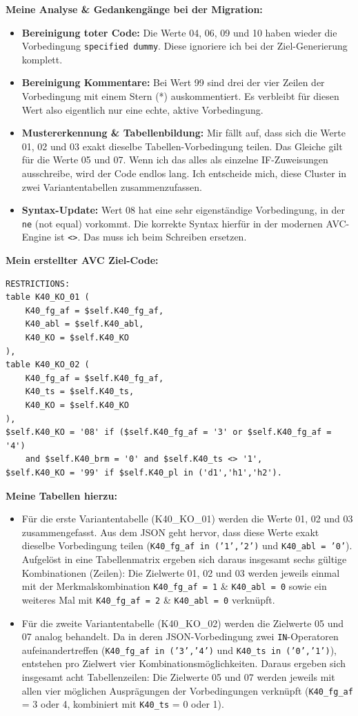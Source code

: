 \documentclass[12pt, a4paper, oneside]{book}
\begin{document}
\textbf{Meine Analyse \& Gedankengänge bei der Migration:}
\begin{itemize}
    \item \textbf{Bereinigung toter Code:} Die Werte 04, 06, 09 und 10 haben wieder die Vorbedingung \texttt{specified dummy}. Diese ignoriere ich bei der Ziel-Generierung komplett.
    \item \textbf{Bereinigung Kommentare:} Bei Wert 99 sind drei der vier Zeilen der Vorbedingung mit einem Stern (*) auskommentiert. Es verbleibt für diesen Wert also eigentlich nur eine echte, aktive Vorbedingung.
    \item \textbf{Mustererkennung \& Tabellenbildung:} Mir fällt auf, dass sich die Werte 01, 02 und 03 exakt dieselbe Tabellen-Vorbedingung teilen. Das Gleiche gilt für die Werte 05 und 07. Wenn ich das alles als einzelne IF-Zuweisungen ausschreibe, wird der Code endlos lang. Ich entscheide mich, diese Cluster in zwei Variantentabellen zusammenzufassen.
    \item \textbf{Syntax-Update:} Wert 08 hat eine sehr eigenständige Vorbedingung, in der \texttt{ne} (not equal) vorkommt. Die korrekte Syntax hierfür in der modernen AVC-Engine ist \texttt{<>}. Das muss ich beim Schreiben ersetzen.
\end{itemize}

\textbf{Mein erstellter AVC Ziel-Code:}
\begin{verbatim}
RESTRICTIONS:
table K40_KO_01 (
    K40_fg_af = $self.K40_fg_af,
    K40_abl = $self.K40_abl,
    K40_KO = $self.K40_KO
),
table K40_KO_02 (
    K40_fg_af = $self.K40_fg_af,
    K40_ts = $self.K40_ts,
    K40_KO = $self.K40_KO
),
$self.K40_KO = '08' if ($self.K40_fg_af = '3' or $self.K40_fg_af = '4') 
    and $self.K40_brm = '0' and $self.K40_ts <> '1',
$self.K40_KO = '99' if $self.K40_pl in ('d1','h1','h2').
\end{verbatim}

\textbf{Meine Tabellen hierzu:}
\begin{itemize}
    \item Für die erste Variantentabelle (K40\_KO\_01) werden die Werte 01, 02 und 03 zusammengefasst. Aus dem JSON geht hervor, dass diese Werte exakt dieselbe Vorbedingung teilen (\texttt{K40\_fg\_af in ('1','2')} und \texttt{K40\_abl = '0'}). Aufgelöst in eine Tabellenmatrix ergeben sich daraus insgesamt sechs gültige Kombinationen (Zeilen): Die Zielwerte 01, 02 und 03 werden jeweils einmal mit der Merkmalskombination \texttt{K40\_fg\_af = 1} \& \texttt{K40\_abl = 0} sowie ein weiteres Mal mit \texttt{K40\_fg\_af = 2} \& \texttt{K40\_abl = 0} verknüpft.
    \item Für die zweite Variantentabelle (K40\_KO\_02) werden die Zielwerte 05 und 07 analog behandelt. Da in deren JSON-Vorbedingung zwei \texttt{IN}-Operatoren aufeinandertreffen (\texttt{K40\_fg\_af in ('3','4')} und \texttt{K40\_ts in ('0','1')}), entstehen pro Zielwert vier Kombinationsmöglichkeiten. Daraus ergeben sich insgesamt acht Tabellenzeilen: Die Zielwerte 05 und 07 werden jeweils mit allen vier möglichen Ausprägungen der Vorbedingungen verknüpft (\texttt{K40\_fg\_af} = 3 oder 4, kombiniert mit \texttt{K40\_ts} = 0 oder 1).
\end{itemize}
\end{document}

